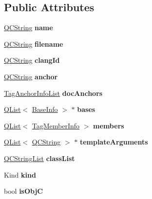 \subsection*{Public Attributes}
\begin{DoxyCompactItemize}
\item 
\mbox{\label{class_tag_class_info_a79d7786b7290613addec8ad9e5a395e4}} 
\mbox{\hyperlink{class_q_c_string}{Q\+C\+String}} {\bfseries name}
\item 
\mbox{\label{class_tag_class_info_a6cd5acb814b8cacb3521a8702591e670}} 
\mbox{\hyperlink{class_q_c_string}{Q\+C\+String}} {\bfseries filename}
\item 
\mbox{\label{class_tag_class_info_ad188dbbabd08fdb1e2c31bd1886c2c0e}} 
\mbox{\hyperlink{class_q_c_string}{Q\+C\+String}} {\bfseries clang\+Id}
\item 
\mbox{\label{class_tag_class_info_ac76955877e95cb376c4afaa1403ecdd0}} 
\mbox{\hyperlink{class_q_c_string}{Q\+C\+String}} {\bfseries anchor}
\item 
\mbox{\label{class_tag_class_info_a9afef69d35cafd8cd8517cb86c6c9aa7}} 
\mbox{\hyperlink{class_tag_anchor_info_list}{Tag\+Anchor\+Info\+List}} {\bfseries doc\+Anchors}
\item 
\mbox{\label{class_tag_class_info_a809c36b15edd5f67a9722ee088ad266c}} 
\mbox{\hyperlink{class_q_list}{Q\+List}}$<$ \mbox{\hyperlink{struct_base_info}{Base\+Info}} $>$ $\ast$ {\bfseries bases}
\item 
\mbox{\label{class_tag_class_info_a010128f2ab7efcbc44492d4163e80bf8}} 
\mbox{\hyperlink{class_q_list}{Q\+List}}$<$ \mbox{\hyperlink{class_tag_member_info}{Tag\+Member\+Info}} $>$ {\bfseries members}
\item 
\mbox{\label{class_tag_class_info_adfe7ae86150e4eeff7f7e8817fc171ff}} 
\mbox{\hyperlink{class_q_list}{Q\+List}}$<$ \mbox{\hyperlink{class_q_c_string}{Q\+C\+String}} $>$ $\ast$ {\bfseries template\+Arguments}
\item 
\mbox{\label{class_tag_class_info_af69c06b0e8182556a7aeb617b156fcab}} 
\mbox{\hyperlink{class_q_c_string_list}{Q\+C\+String\+List}} {\bfseries class\+List}
\item 
\mbox{\label{class_tag_class_info_aec6fc8257dce19a4ff40e968ce3a7b8b}} 
Kind {\bfseries kind}
\item 
\mbox{\label{class_tag_class_info_a0814ea347ddb07527c3c6481edd3be4c}} 
bool {\bfseries is\+ObjC}
\end{DoxyCompactItemize}


